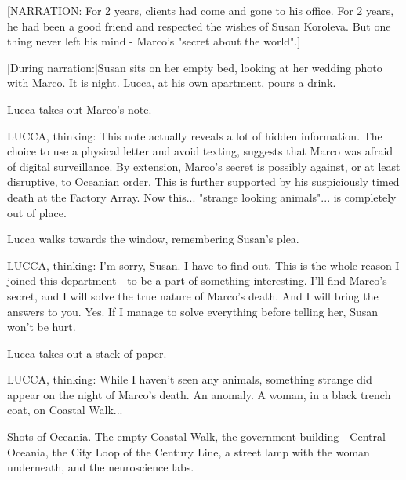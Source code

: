\documentclass[11pt]{article}
\begin{document}
[NARRATION: For 2 years, clients had come and gone to his office. For 2 years, he had been a good friend and respected the wishes of Susan Koroleva. But one thing never left his mind - Marco's "secret about the world".]

[During narration:]Susan sits on her empty bed, looking at her wedding photo with Marco. It is night. Lucca, at his own apartment, pours a drink.

Lucca takes out Marco's note.

LUCCA, thinking: 
This note actually reveals a lot of hidden information. 
The choice to use a physical letter and avoid texting, suggests that Marco was afraid of digital surveillance. 
By extension, Marco's secret is possibly against, or at least disruptive, to Oceanian order. 
This is further supported by his suspiciously timed death at the Factory Array.
Now this... "strange looking animals"... is completely out of place.

Lucca walks towards the window, remembering Susan's plea. 

LUCCA, thinking: I'm sorry, Susan. I have to find out. This is the whole reason I joined this department - to be a part of something interesting. I'll find Marco's secret, and I will solve the true nature of Marco's death. And I will bring the answers to you. Yes. If I manage to solve everything before telling her, Susan won't be hurt. 

Lucca takes out a stack of paper. 

LUCCA, thinking: While I haven't seen any animals, something strange did appear on the night of Marco's death. An anomaly. A woman, in a black trench coat, on Coastal Walk...

Shots of Oceania. 
The empty Coastal Walk, the government building - Central Oceania, the City Loop of the Century Line, a street lamp with the woman underneath, and the neuroscience labs.
\end{document}
